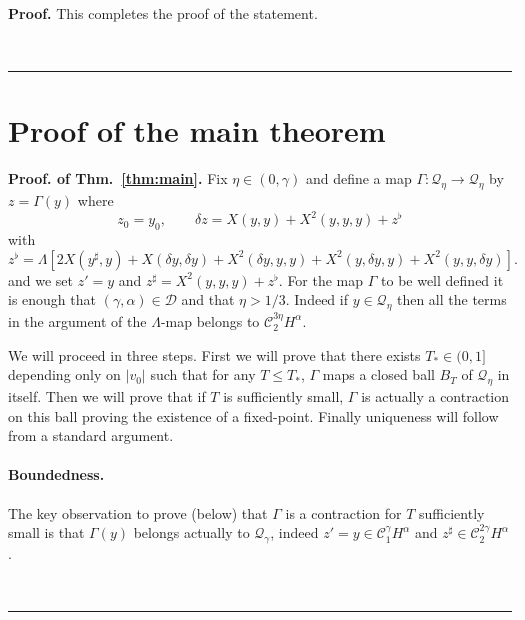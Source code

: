 \documentclass[a4paper,11pt,reqno]{article}
\newcommand{\der}{\delta}
\newcommand{\CC}{\mathcal{C}}
\newcommand{\DD}{\mathcal{D}}
\newcommand{\QQ}{\mathcal{Q}}
\newenvironment{proof}[1][Proof]{\textbf{#1.} }{\ \rule{0.5em}{0.5em}}
\begin{document}
\begin{proof}
This completes the proof of the statement.

\end{proof}

\section{Proof of the main theorem}
\label{sec:main-proof}


\begin{proof}[Proof. of Thm.~\ref{thm:main}] Fix $\eta \in (0,\gamma)$ and
 define
a map $\Gamma: \QQ_\eta \to \QQ_\eta$ by $z = \Gamma(y)$ where
\begin{equation}
  \label{eq:gamma}
z_0 = y_0, \qquad \der z = X(y,y) + X^2(y,y,y) + z^\flat
\end{equation}
with
$$
z^\flat = \Lambda[ 2 X(y^\sharp,y) 
+ X(\der y,\der y) 
 + X^2(\der y,y,y) +
X^2(y,\der y,y) + X^2( y,y,\der y)   ].
$$
and we set $z' = y$ and $z^\sharp = X^2(y,y,y) + z^\flat$. For the map
$\Gamma$ to be well defined it is enough that $(\gamma,\alpha) \in
\DD$ and that $\eta > 1/3$. Indeed if $y \in \QQ_\eta$ then all the
terms in the argument of the $\Lambda$-map belongs to
$\CC_2^{3\eta}H^\alpha$.
 
We will proceed in three steps. First we will prove that there exists
$T_*\in(0,1]$  depending only on $|v_0|$ such that for any $T\le T_* $, $\Gamma$ maps a closed ball $B_T$ of $\QQ_{\eta}$ in
itself. Then we will prove that if $T$ is sufficiently small, $\Gamma$
is actually a contraction on this ball proving the existence  of a
fixed-point. Finally uniqueness will follow from a standard argument.


\paragraph{Boundedness.}
The key observation to prove (below) that $\Gamma$
is a contraction for $T$ sufficiently small is that $\Gamma(y)$
belongs actually to $\QQ_\gamma$, indeed $z' = y \in \CC_1^\gamma
H^\alpha$ and $z^\sharp \in \CC_2^{2\gamma} H^\alpha$. 


\end{proof}
\end{document}
